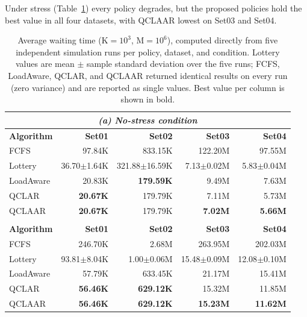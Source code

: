 \documentclass[preprint,12pt]{elsarticle}
\newcommand{\QCLAAR}{\textsc{QCLAAR}}
\begin{document}
Under stress (Table~\ref{tab:wait}) every policy degrades, but the proposed
policies hold the best value in all four datasets, with \QCLAAR{} lowest on
Set03 and Set04.

\begin{table}[htbp]
\centering
\caption{Average waiting time ($\mathrm{K} = 10^{3}$, $\mathrm{M} = 10^{6}$),
computed directly from five independent simulation runs per policy, dataset,
and condition. Lottery values are mean $\pm$ sample standard deviation over the
five runs; FCFS, LoadAware, QCLAR, and QCLAAR returned identical results on
every run (zero variance) and are reported as single values. Best value per
column is shown in bold.}
\label{tab:wait}
\small
\setlength{\tabcolsep}{5pt}
\begin{tabular}{lrrrr}
\multicolumn{5}{c}{\textit{(a) No-stress condition}} \\
\toprule
\textbf{Algorithm} & \textbf{Set01} & \textbf{Set02} & \textbf{Set03} & \textbf{Set04} \\
\midrule
FCFS      & 97.84K            & 833.15K            & 122.20M            & 97.55M \\
Lottery   & 36.70$\pm$1.64K   & 321.88$\pm$16.59K  & 7.13$\pm$0.02M     & 5.83$\pm$0.04M \\
LoadAware & 20.83K            & \textbf{179.59K}   & 9.49M              & 7.63M \\
QCLAR     & \textbf{20.67K}   & 179.79K            & 7.11M              & 5.73M \\
QCLAAR    & \textbf{20.67K}   & 179.79K            & \textbf{7.02M}     & \textbf{5.66M} \\
\bottomrule
\addlinespace[1.2ex]
\multicolumn{5}{c}{\textit{(b) Stress condition}} \\
\toprule
\textbf{Algorithm} & \textbf{Set01} & \textbf{Set02} & \textbf{Set03} & \textbf{Set04} \\
\midrule
FCFS      & 246.70K           & 2.68M              & 263.95M            & 202.03M \\
Lottery   & 93.81$\pm$8.04K   & 1.00$\pm$0.06M     & 15.48$\pm$0.09M    & 12.08$\pm$0.10M \\
LoadAware & 57.79K            & 633.45K            & 21.17M             & 15.41M \\
QCLAR     & \textbf{56.46K}   & \textbf{629.12K}   & 15.32M             & 11.85M \\
QCLAAR    & \textbf{56.46K}   & \textbf{629.12K}   & \textbf{15.23M}    & \textbf{11.62M} \\
\bottomrule
\end{tabular}
\end{table}
\end{document}
